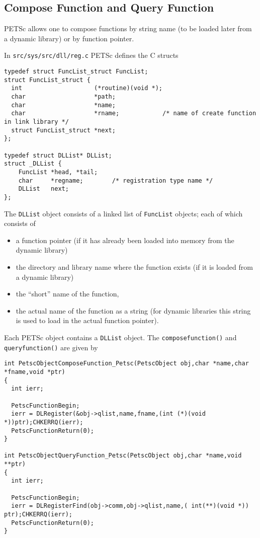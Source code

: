 \subsection{Compose Function and Query Function}

PETSc allows one to compose functions by string name (to be loaded later from 
a dynamic library) or by function pointer. 

In {\tt src/sys/src/dll/reg.c} PETSc defines the C structs
\begin{verbatim}
typedef struct FuncList_struct FuncList;
struct FuncList_struct {
  int                    (*routine)(void *);
  char                   *path;
  char                   *name;               
  char                   *rname;            /* name of create function in link library */
  struct FuncList_struct *next;
};

typedef struct DLList* DLList;
struct _DLList {
    FuncList *head, *tail;
    char     *regname;        /* registration type name */
    DLList   next;
};
\end{verbatim}

The {\tt DLList} object consists of a linked list of {\tt FuncList} objects; each 
of which consists of 
\begin{itemize}
\item a function pointer (if it has already been loaded into memory from the dynamic library)
\item the directory and library name where the function exists (if it is loaded from a 
      dynamic library)
\item the ``short'' name of the function,
\item the actual name of the function as a string (for dynamic libraries this string is used
      to load in the actual function pointer).
\end{itemize}

Each PETSc object contains a {\tt DLList} object. The {\tt composefunction()} and 
{\tt queryfunction()} are given by 

\begin{verbatim}
int PetscObjectComposeFunction_Petsc(PetscObject obj,char *name,char *fname,void *ptr)
{
  int ierr;

  PetscFunctionBegin;
  ierr = DLRegister(&obj->qlist,name,fname,(int (*)(void *))ptr);CHKERRQ(ierr);
  PetscFunctionReturn(0);
}

int PetscObjectQueryFunction_Petsc(PetscObject obj,char *name,void **ptr)
{
  int ierr;

  PetscFunctionBegin;
  ierr = DLRegisterFind(obj->comm,obj->qlist,name,( int(**)(void *)) ptr);CHKERRQ(ierr);
  PetscFunctionReturn(0);
}
\end{verbatim}

